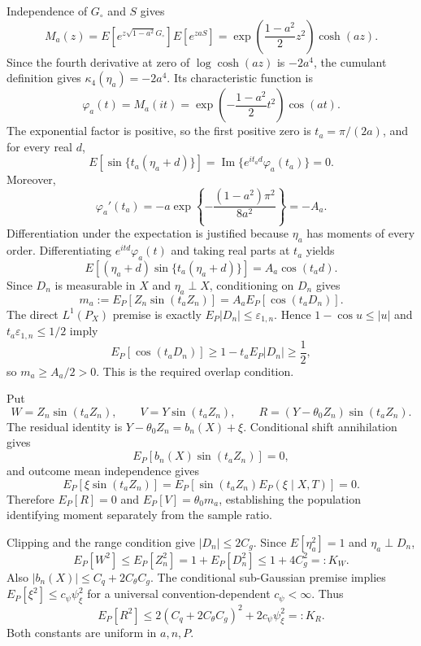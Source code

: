 Independence of \(G_{\circ}\) and \(S\) gives
\[
 M_a(z)
 =E[e^{z\sqrt{1-a^2}G_{\circ}}]E[e^{zaS}]
 =\exp\!\left(\frac{1-a^2}{2}z^2\right)\cosh(az).
\]
Since the fourth derivative at zero of \(\log\cosh(az)\) is \(-2a^4\), the cumulant definition gives \(\kappa_4(\eta_a)=-2a^4\).  Its characteristic function is
\[
 \varphi_a(t)=M_a(it)
 =\exp\!\left(-\frac{1-a^2}{2}t^2\right)\cos(at).
\]
The exponential factor is positive, so the first positive zero is \(t_a=\pi/(2a)\), and for every real \(d\),
\[
 E[\sin\{t_a(\eta_a+d)\}]
 =\operatorname{Im}\{e^{it_ad}\varphi_a(t_a)\}=0.
\]
Moreover,
\[
 \varphi_a'(t_a)
 =-a\exp\!\left\{-\frac{(1-a^2)\pi^2}{8a^2}\right\}=-A_a.
\]
Differentiation under the expectation is justified because \(\eta_a\) has moments of every order.  Differentiating \(e^{itd}\varphi_a(t)\) and taking real parts at \(t_a\) yields
\[
 E[(\eta_a+d)\sin\{t_a(\eta_a+d)\}]=A_a\cos(t_ad).
\]
Since \(D_n\) is measurable in \(X\) and \(\eta_a\perp X\), conditioning on \(D_n\) gives
\[
 m_a:=E_P[Z_n\sin(t_aZ_n)]=A_aE_P[\cos(t_aD_n)].
\]
The direct \(L^1(P_X)\) premise is exactly \(E_P|D_n|\le\varepsilon_{1,n}\).  Hence \(1-\cos u\le|u|\) and \(t_a\varepsilon_{1,n}\le1/2\) imply
\[
 E_P[\cos(t_aD_n)]
 \ge1-t_aE_P|D_n|
 \ge\frac12,
\]
so \(m_a\ge A_a/2>0\).  This is the required overlap condition.

Put
\[
 W=Z_n\sin(t_aZ_n),\qquad
 V=Y\sin(t_aZ_n),\qquad
 R=(Y-\theta_0Z_n)\sin(t_aZ_n).
\]
The residual identity is \(Y-\theta_0Z_n=b_n(X)+\xi\).  Conditional shift annihilation gives
\[
 E_P[b_n(X)\sin(t_aZ_n)]=0,
\]
and outcome mean independence gives
\[
 E_P[\xi\sin(t_aZ_n)]
 =E_P[\sin(t_aZ_n)E_P(\xi\mid X,T)]=0.
\]
Therefore \(E_P[R]=0\) and \(E_P[V]=\theta_0m_a\), establishing the population identifying moment separately from the sample ratio.

Clipping and the range condition give \(|D_n|\le2C_g\).  Since \(E[\eta_a^2]=1\) and \(\eta_a\perp D_n\),
\[
 E_P[W^2]\le E_P[Z_n^2]
 =1+E_P[D_n^2]\le1+4C_g^2=:K_W.
\]
Also \(|b_n(X)|\le C_q+2C_{\theta}C_g\).  The conditional sub-Gaussian premise implies \(E_P[\xi^2]\le c_{\psi}\psi_{\xi}^2\) for a universal convention-dependent \(c_{\psi}<\infty\).  Thus
\[
 E_P[R^2]
 \le2(C_q+2C_{\theta}C_g)^2+2c_{\psi}\psi_{\xi}^2=:K_R.
\]
Both constants are uniform in \(a,n,P\).

